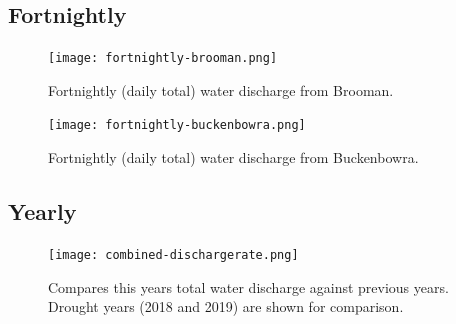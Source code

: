 \documentclass[10pt]{article}
\begin{document}
\subsection{Fortnightly}

\begin{figure}[H]
\centering
\texttt{[image: fortnightly-brooman.png]}
\caption[Fortnightly Discharge From Brooman Tributary]{Fortnightly (daily total) water discharge from Brooman.}
\end{figure}

\begin{figure}[H]
\centering
\texttt{[image: fortnightly-buckenbowra.png]}
\caption[Fortnightly Discharge Rate Buckenbowra]{Fortnightly (daily total) water discharge from Buckenbowra.}
\end{figure}

\subsection{Yearly}
\begin{figure}[H]
\centering
\texttt{[image: combined-dischargerate.png]}
\caption[Yearly Cumulative Discharge Rate Brooman]{Compares this years total water discharge against previous years. Drought years (2018 and 2019) are shown for comparison.}
\end{figure}
\end{document}
